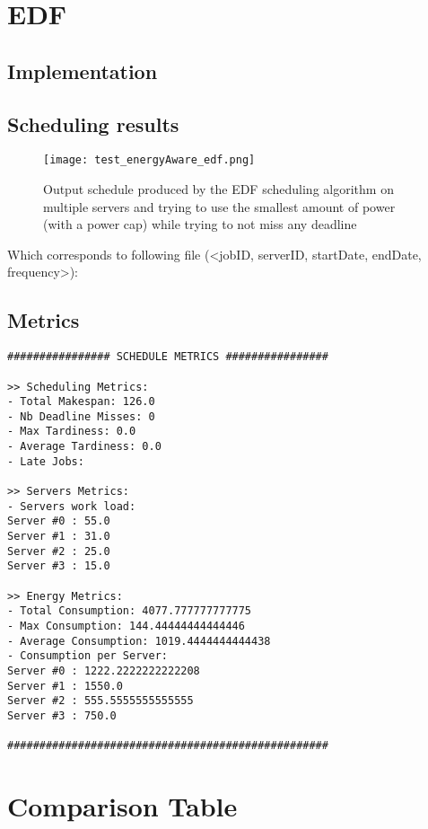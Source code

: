 \documentclass[./report.tex]{subfiles}
\begin{document}
\newpage
\section{EDF}
\subsection{Implementation}

\newpage
\subsection{Scheduling results}
\begin{figure}[!h]
	\center
	\texttt{[image: test\_energyAware\_edf.png]}
	\caption{Output schedule produced by the EDF scheduling algorithm on multiple servers and trying to use the smallest amount of power (with a power cap) while trying to not miss any deadline}
	\label{fig:energyAware_fifo} 
\end{figure}

Which corresponds to following file (<jobID, serverID, startDate, endDate, frequency>):


\newpage
\subsection{Metrics}
\begin{lstlisting}[style=txt, caption={Metrics for EDF on multiple energy aware servers}]
################ SCHEDULE METRICS ################

>> Scheduling Metrics: 
- Total Makespan: 126.0
- Nb Deadline Misses: 0
- Max Tardiness: 0.0
- Average Tardiness: 0.0
- Late Jobs: 

>> Servers Metrics: 
- Servers work load:
Server #0 : 55.0
Server #1 : 31.0
Server #2 : 25.0
Server #3 : 15.0

>> Energy Metrics: 
- Total Consumption: 4077.777777777775
- Max Consumption: 144.44444444444446
- Average Consumption: 1019.4444444444438
- Consumption per Server: 
Server #0 : 1222.2222222222208
Server #1 : 1550.0
Server #2 : 555.5555555555555
Server #3 : 750.0

##################################################
\end{lstlisting}


\newpage
\section{Comparison Table}
\end{document}
